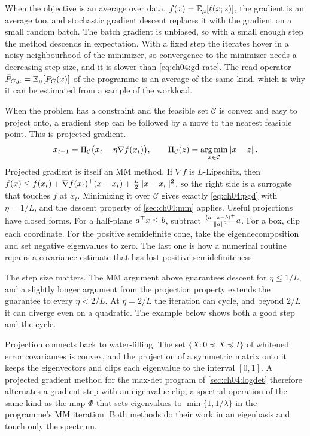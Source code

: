 When the objective is an average over data, $f(x)=\mathbb{E}_\mu[\ell(x;z)]$, the gradient is an average too, and stochastic gradient descent replaces it with the gradient on a small random batch. The batch gradient is unbiased, so with a small enough step the method descends in expectation. With a fixed step the iterates hover in a noisy neighbourhood of the minimizer, so convergence to the minimizer needs a decreasing step size, and it is slower than \eqref{eq:ch04:gd-rate}. The read operator $\bar P_{C,\mu}=\mathbb{E}_\mu[P_C(x)]$ of the programme is an average of the same kind, which is why it can be estimated from a sample of the workload.

When the problem has a constraint and the feasible set $\mathcal C$ is convex and easy to project onto, a gradient step can be followed by a move to the nearest feasible point. This is projected gradient.
\begin{equation}\label{eq:ch04:pgd}
x_{t+1}=\Pi_{\mathcal C}\bigl(x_t-\eta\nabla f(x_t)\bigr),\qquad \Pi_{\mathcal C}(z)=\operatorname*{arg\,min}_{x\in\mathcal C}\lVert x-z\rVert.
\end{equation}
Projected gradient is itself an MM method. If $\nabla f$ is $L$-Lipschitz, then $f(x)\le f(x_t)+\nabla f(x_t)^{\top}(x-x_t)+\frac L2\lVert x-x_t\rVert^2$, so the right side is a surrogate that touches $f$ at $x_t$. Minimizing it over $\mathcal C$ gives exactly \eqref{eq:ch04:pgd} with $\eta=1/L$, and the descent property of \cref{sec:ch04:mm} applies. Useful projections have closed forms. For a half-plane $a^{\top} x\le b$, subtract $\frac{(a^{\top} z-b)^+}{\lVert a\rVert^2}a$. For a box, clip each coordinate. For the positive semidefinite cone, take the eigendecomposition and set negative eigenvalues to zero. The last one is how a numerical routine repairs a covariance estimate that has lost positive semidefiniteness.

The step size matters. The MM argument above guarantees descent for $\eta\le1/L$, and a slightly longer argument from the projection property extends the guarantee to every $\eta<2/L$. At $\eta=2/L$ the iteration can cycle, and beyond $2/L$ it can diverge even on a quadratic. The example below shows both a good step and the cycle.

Projection connects back to water-filling. The set $\{X:0\preceq X\preceq I\}$ of whitened error covariances is convex, and the projection of a symmetric matrix onto it keeps the eigenvectors and clips each eigenvalue to the interval $[0,1]$. A projected gradient method for the max-det program of \cref{sec:ch04:logdet} therefore alternates a gradient step with an eigenvalue clip, a spectral operation of the same kind as the map $\Phi$ that sets eigenvalues to $\min\{1,1/\lambda\}$ in the programme's MM iteration. Both methods do their work in an eigenbasis and touch only the spectrum.

